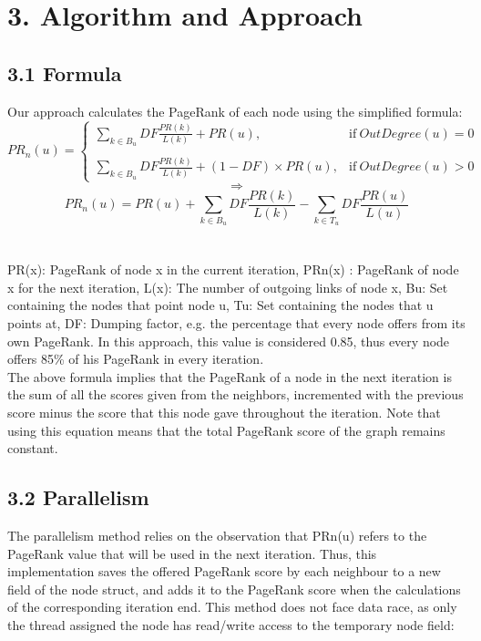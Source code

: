 \documentclass{article}
\begin{document}
\section*{3. Algorithm and Approach}
\subsection*{3.1 Formula}
Our approach calculates the PageRank of each node using the simplified formula:\\


\begin{equation}
    PR_n(u) = 
    \begin{cases}
      \displaystyle\sum_{k\in B_u}^{}DF \frac{PR(k)}{L(k)} + PR(u), & \text{if}\ OutDegree(u) = 0 \\\\
      \displaystyle\sum_{k\in B_u}^{}DF \frac{PR(k)}{L(k)} + (1 - DF)\times PR(u), &  \text{if}\ OutDegree(u) > 0
    \end{cases}
\end{equation}
\[\Rightarrow\]
\begin{equation}
   PR_n(u) = PR(u) + \sum_{k\in B_u}^{}DF \frac{PR(k)}{L(k)} - \sum_{k\in T_u}^{}DF \frac{PR(u)}{L(u)}
\end{equation}
\\\\
PR(x): PageRank of node x in the current iteration,
PRn(x) : PageRank of node x for the next iteration,
L(x): The number of outgoing links of node x,
Bu: Set containing the nodes that point node u,
Tu: Set containing the nodes that u points at,
DF: Dumping factor, e.g. the percentage that every node offers from its own PageRank. In this approach, this value is considered 0.85, thus every node offers 85\% of his PageRank in every iteration. 
\\
The above formula implies that the PageRank of a node in the next iteration is the sum of all the scores given from the neighbors, incremented with the previous score minus the score that this node gave throughout the iteration. Note that using this equation means that the total PageRank score of the graph remains constant.

\subsection*{3.2 Parallelism}
The parallelism method relies on the observation that PRn(u) refers to the PageRank value that will be used in the next iteration. Thus, this implementation saves the offered PageRank score by each neighbour to a new field of the node struct, and adds it to the PageRank score when the calculations of the corresponding iteration end. This method does not face data race, as only the thread assigned the node has read/write access to the temporary node field:
\end{document}
